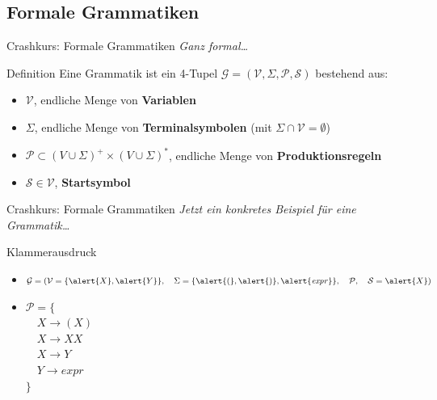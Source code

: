 \documentclass[18pt]{beamer}
\begin{document}
\subsection{Formale Grammatiken}

\begin{frame}{Crashkurs: Formale Grammatiken}
    \textit{Ganz formal\dots}
    \begin{block}{Definition}
        Eine Grammatik ist ein 4-Tupel $\mathcal{G} = (\mathcal{V}, \Sigma, \mathcal{P}, \mathcal{S})$ bestehend aus:
        \begin{itemize}
            \item $\mathcal{V}$, endliche Menge von \textbf{Variablen}
            \item $\Sigma$, endliche Menge von \textbf{Terminalsymbolen} (mit $\Sigma \cap \mathcal{V} = \emptyset$)
            \item $\mathcal{P} \subset (V \cup \Sigma)^+ \times (V \cup \Sigma)^*$, endliche Menge von \textbf{Produktionsregeln}
            \item $\mathcal{S} \in \mathcal{V}$, \textbf{Startsymbol}
        \end{itemize}
    \end{block}
\end{frame}

\begin{frame}{Crashkurs: Formale Grammatiken}
    \textit{Jetzt ein konkretes Beispiel für eine Grammatik\dots}
    \begin{block}{Klammerausdruck}
        \begin{itemize}
            \item $\mathcal{G} = (\mathcal{V} = \{\alert{X}, \alert{Y}\}, \quad \Sigma = \{\alert{(}, \alert{)}, \alert{\mathit{expr}}\}, \quad \mathcal{P}, \quad \mathcal{S} = \alert{X})$
            \item $\mathcal{P} = \{$\\
            $\quad X \longrightarrow (X)$\\
            $\quad X \longrightarrow XX$\\
            $\quad X \longrightarrow Y$\\
            $\quad Y \longrightarrow \mathit{expr}$\\
            $\}$
        \end{itemize}
    \end{block}
\end{frame}
\end{document}
